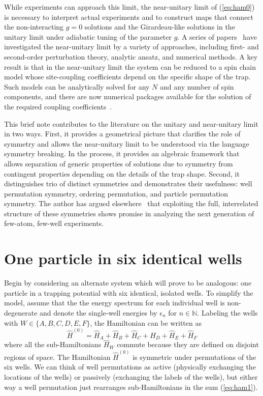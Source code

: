 While experiments can approach this limit, the near-unitary limit of (\ref{eq:ham0}) is necessary to interpret actual experiments and to construct maps that connect the non-interacting $g=0$ solutions and the Girardeau-like solutions in the unitary limit under adiabatic tuning of the parameter $g$. A series of papers~\cite{Deuretzbacher2014, Volosniev2013, Levinsen2014, Gharashi2015, Yang2015, Decamp2016} have investigated the near-unitary limit by a variety of approaches, including first- and second-order perturbation theory, analytic ansatz, and numerical methods. A key result is that in the near-unitary limit the system can be reduced to a spin chain model whose site-coupling coefficients depend on the specific shape of the trap. Such models can be analytically solved for any $N$ and any number of spin components, and there are now numerical packages available for the solution of the required coupling coefficients~\cite{CONAN}.

This brief note contributes to the literature on the unitary and near-unitary limit in two ways. First, it provides a geometrical picture that clarifies the role of symmetry and allows the near-unitary limit to be understood via the language symmetry breaking. In the process, it provides an algebraic framework that allows separation of generic properties of solutions due to symmetry from contingent properties depending on the details of the trap shape. Second, it distinguishes trio of distinct symmetries and demonstrates their usefulness: well permutation symmetry, ordering permutation, and particle permutation symmetry. The author has argued elsewhere~\cite{harshman2016c} that exploiting the full, interrelated structure of these symmetries shows promise in analyzing the next generation of few-atom, few-well experiments.

\section{One particle in six identical wells}


Begin by considering an alternate system which will prove to be analogous: one particle in a trapping potential with six identical, isolated wells. To simplify the model, assume that the the energy spectrum for each individual well is non-degenerate and denote the single-well energies by $\epsilon_n$ for $n\in\mathbb{N}$. Labeling the wells with $W\in\{A,B,C,D,E,F\}$, the Hamiltonian can be written as 
\begin{equation}\label{eq:ham1}
\hat{H}^{(0)} = \hat{H}_A +\hat{H}_B +\hat{H}_C +\hat{H}_D +\hat{H}_E + \hat{H}_F
\end{equation}
where all the sub-Hamiltonians $\hat{H}_W$ commute because they are defined on disjoint regions of space. The Hamiltonian $\hat{H}^{(0)}$ is symmetric under permutations of the six wells. We can think of well permutations as active (physically exchanging the locations of the wells) or passively (exchanging the labels of the wells), but either way a well permutation just rearranges sub-Hamiltonians in the sum (\ref{eq:ham1}). 

